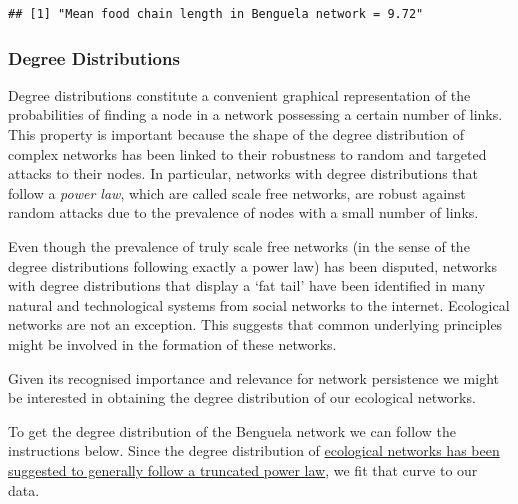 \documentclass[
]{article}
\begin{document}
\begin{verbatim}
## [1] "Mean food chain length in Benguela network = 9.72"
\end{verbatim}

\subsubsection{Degree Distributions}\label{degree-distributions}

Degree distributions constitute a convenient graphical representation of
the probabilities of finding a node in a network possessing a certain
number of links. This property is important because the shape of the
degree distribution of complex networks has been linked to their
robustness to random and targeted attacks to their nodes. In particular,
networks with degree distributions that follow a \emph{power law}, which
are called scale free networks, are robust against random attacks due to
the prevalence of nodes with a small number of links.

Even though the prevalence of truly scale free networks (in the sense of
the degree distributions following exactly a power law) has been
disputed, networks with degree distributions that display a `fat tail'
have been identified in many natural and technological systems from
social networks to the internet. Ecological networks are not an
exception. This suggests that common underlying principles might be
involved in the formation of these networks.

Given its recognised importance and relevance for network persistence we
might be interested in obtaining the degree distribution of our
ecological networks.

To get the degree distribution of the Benguela network we can follow the
instructions below. Since the degree distribution of
\href{https://www.nature.com/articles/nature04927}{ecological networks
has been suggested to generally follow a truncated power law}, we fit
that curve to our data.
\end{document}

